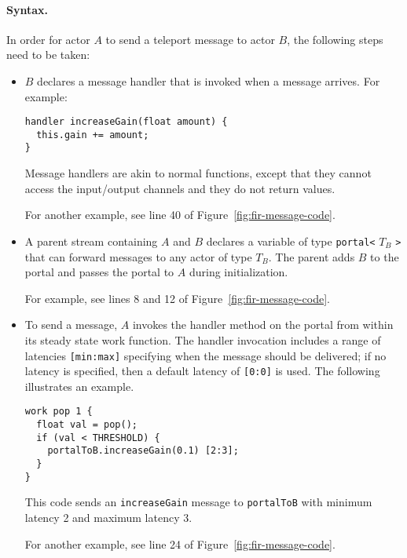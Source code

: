 \paragraph*{Syntax.}  In order for actor $A$ to send a teleport message to
actor $B$, the following steps need to be taken:
\begin{itemize}

\item $B$ declares a message handler that is invoked when a
message arrives.  For example: {\small
\vspace{-5pt}
\begin{verbatim}
handler increaseGain(float amount) {
  this.gain += amount;
}
\end{verbatim}
\vspace{-5pt}}
Message handlers are akin to normal functions, except that they
cannot access the input/output channels and they do not return values.

For another example, see line 40 of Figure~\ref{fig:fir-message-code}.

\item A parent stream containing $A$ and $B$ declares a variable
of type {\tt portal<} $T_B$ {\tt >} that can forward messages to
any actor of type $T_B$.  The parent adds $B$ to the portal and passes
the portal to $A$ during initialization.

For example, see lines 8 and 12 of Figure~\ref{fig:fir-message-code}.

\item To send a message, $A$ invokes the handler method on the portal
from within its steady state work function. The handler invocation
includes a range of latencies {\tt [min:max]} specifying when the
message should be delivered; if no latency is specified, then a
default latency of {\tt [0:0]} is used.  The following illustrates an
example.{\small
\vspace{-5pt}
\begin{verbatim}
work pop 1 {
  float val = pop();
  if (val < THRESHOLD) {
    portalToB.increaseGain(0.1) [2:3];
  }
}
\end{verbatim}\vspace{-5pt}}
This code sends an {\tt increaseGain} message to {\tt portalToB} with
minimum latency 2 and maximum latency 3.

For another example, see line 24 of Figure~\ref{fig:fir-message-code}.

\end{itemize}

